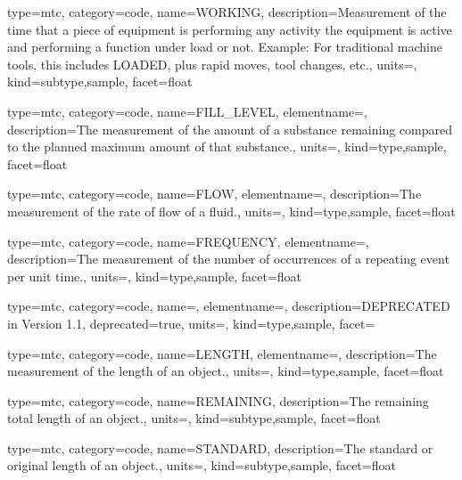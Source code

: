 {
  type=mtc,
  category=code,
  name={WORKING},
  description={Measurement of the time that a piece of equipment is performing any activity  the equipment is active and performing a function under load or not. \newline Example: For traditional machine tools, this includes LOADED, plus rapid moves, tool changes, etc.},
  units=,
  kind={subtype,sample},
  facet={\gls{float}}
}


{
  type=mtc,
  category=code,
  name={FILL\_LEVEL},
  elementname=,
  description={The measurement of the amount of a substance remaining compared to the planned maximum amount of that substance.},
  units=,
  kind={type,sample},
  facet={\gls{float}}
}


{
  type=mtc,
  category=code,
  name={FLOW},
  elementname=,
  description={The measurement of the rate of flow of a fluid.},
  units=,
  kind={type,sample},
  facet={\gls{float}}
}


{
  type=mtc,
  category=code,
  name={FREQUENCY},
  elementname=,
  description={The measurement of the number of occurrences of a repeating event per unit time.},
  units=,
  kind={type,sample},
  facet={\gls{float}}
}


{
  type=mtc,
  category=code,
  name=,
  elementname=,
  description={DEPRECATED in Version 1.1},
  deprecated={true},
  units={},
  kind={type,sample},
  facet={}
}


{
  type=mtc,
  category=code,
  name={LENGTH},
  elementname=,
  description={The measurement of the length of an object.},
  units=,
  kind={type,sample},
  facet={\gls{float}}
}


{
  type=mtc,
  category=code,
  name={REMAINING},
  description={The remaining total length of an object.},
  units=,
  kind={subtype,sample},
  facet={\gls{float}}
}


{
  type=mtc,
  category=code,
  name={STANDARD},
  description={The standard or original length of an object.},
  units=,
  kind={subtype,sample},
  facet={\gls{float}}
}


